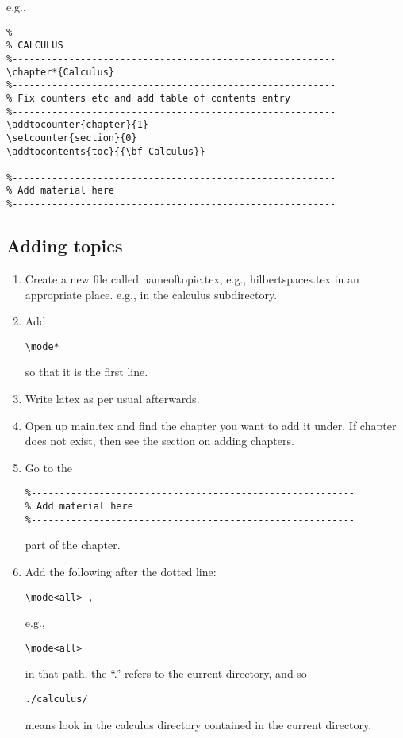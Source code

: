 \documentclass{article}
\begin{document}
e.g.,
\begin{verbatim}
%---------------------------------------------------------
% CALCULUS
%---------------------------------------------------------
\chapter*{Calculus}
%---------------------------------------------------------
% Fix counters etc and add table of contents entry
%---------------------------------------------------------
\addtocounter{chapter}{1}
\setcounter{section}{0}
\addtocontents{toc}{{\bf Calculus}}

%---------------------------------------------------------
% Add material here
%---------------------------------------------------------
\end{verbatim}


\subsection{Adding topics}
\begin{enumerate}
\item Create a new file called nameoftopic.tex, e.g., hilbertspaces.tex in an
appropriate place. e.g., in the calculus subdirectory.
\item Add \begin{verbatim}\mode*\end{verbatim} so that
it is the first line.
\item Write latex as per usual afterwards.
\item Open up main.tex and find the chapter you want to add it under.  If chapter
does not exist, then see the section on adding chapters.
\item Go to the
\begin{verbatim}
%---------------------------------------------------------
% Add material here
%---------------------------------------------------------
\end{verbatim}
part of the chapter.

\item Add the following after the dotted line:
\begin{verbatim}
\mode<all> ,
\end{verbatim}

e.g.,
\begin{verbatim}
\mode<all> 
\end{verbatim}

in that path, the ``.'' refers to the current directory, and so
\begin{verbatim}
./calculus/
\end{verbatim} means
look in the calculus directory contained in the current directory.
\end{enumerate}
\end{document}
